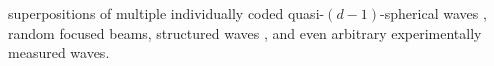 superpositions of
multiple individually coded quasi-$(d-1)$-spherical waves
\cite{article:MisaridisITUFFC2005},
random focused beams,
structured waves
\cite{article:IlovitshNatComBio2018}, and even
arbitrary experimentally measured waves.

